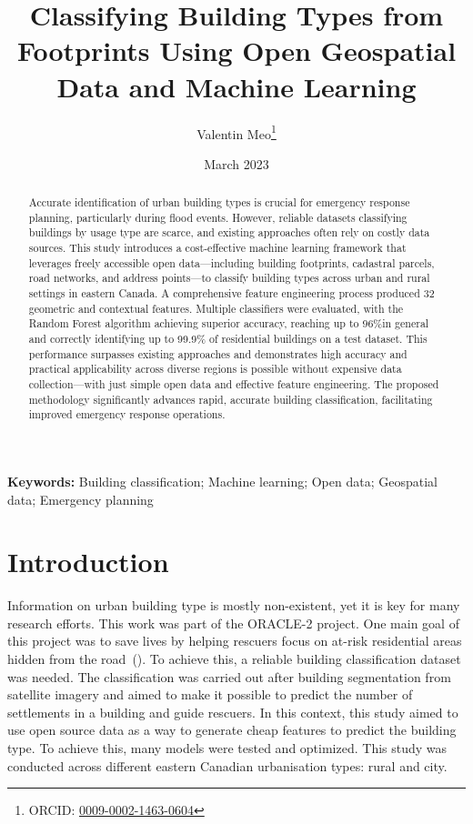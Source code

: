 \documentclass[11pt]{article}
\title{Classifying Building Types from Footprints Using Open Geospatial Data and Machine Learning}
\author[1]{Valentin Meo\thanks{ORCID: \href{https://orcid.org/0009-0002-1463-0604}{0009-0002-1463-0604}}}
\affil[1]{Center for Research in Data and Geospatial Intelligence (CRDIG), Université Laval, Québec, Canada\\ \texttt{valentin.meo.1@ulaval.ca}}
\date{March 2023}
\begin{document}
\maketitle

\begin{abstract}
Accurate identification of urban building types is crucial for emergency response planning, particularly during flood events. However, reliable datasets classifying buildings by usage type are scarce, and existing approaches often rely on costly data sources. This study introduces a cost-effective machine learning framework that leverages freely accessible open data—including building footprints, cadastral parcels, road networks, and address points—to classify building types across urban and rural settings in eastern Canada. A comprehensive feature engineering process produced 32 geometric and contextual features. Multiple classifiers were evaluated, with the Random Forest algorithm achieving superior accuracy, reaching up to 96\%in general and correctly identifying up to 99.9\% of residential buildings on a test dataset. This performance surpasses existing approaches and demonstrates high accuracy and practical applicability across diverse regions is possible without expensive data collection—with just simple open data and effective feature engineering. The proposed methodology significantly advances rapid, accurate building classification, facilitating improved emergency response operations.
\end{abstract}

\textbf{Keywords:} Building classification; Machine learning; Open data; Geospatial data; Emergency planning

\section{Introduction}
Information on urban building type is mostly non-existent, yet it is key for many research efforts. This work was part of the ORACLE-2 project. One main goal of this project was to save lives by helping rescuers focus on at-risk residential areas hidden from the road~(\cite{badard2021geomatique}). To achieve this, a reliable building classification dataset was needed. The classification was carried out after building segmentation from satellite imagery and aimed to make it possible to predict the number of settlements in a building and guide rescuers. In this context, this study aimed to use open source data as a way to generate cheap features to predict the building type. To achieve this, many models were tested and optimized. This study was conducted across different eastern Canadian urbanisation types: rural and city.
\end{document}
